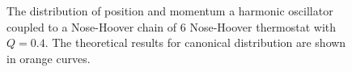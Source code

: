 \documentclass{article}
\begin{document}
\begin{figure}[t]
    \centering
    \caption{The distribution of position and momentum a harmonic oscillator coupled to a Nose-Hoover chain of 6 Nose-Hoover thermostat with $Q = 0.4$. The theoretical results for canonical distribution are shown in orange curves.}
\end{figure}
\end{document}
